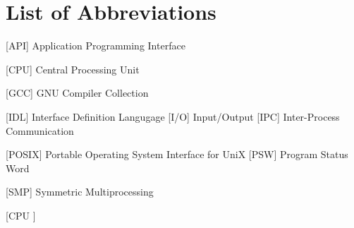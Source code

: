 
\chapter*{List of Abbreviations}

\begin{acronym} [CPU ]
 [API] {Application Programming Interface}


 [CPU] {Central Processing Unit}




 [GCC] {GNU Compiler Collection}


 [IDL] {Interface Definition Langugage}
 [I/O] {Input/Output}
[IPC] {Inter-Process Communication}







 [POSIX] {Portable Operating System Interface for UniX}
 [PSW] {Program Status Word}



 [SMP] {Symmetric Multiprocessing}








\end{acronym} [CPU ]
